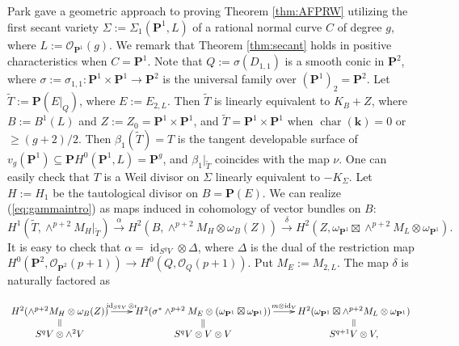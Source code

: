 \documentclass[graybox]{svmult}
\newcommand{\kk}{\mathbf{k}}
\newcommand{\sO}{\mathscr{O}}
\def\nP{\mathbf{P}}
\def\id{\operatorname{id}}
\begin{document}
Park \cite{Park2} gave a geometric approach to proving Theorem \ref{thm:AFPRW} utilizing the first secant variety $\Sigma:=\Sigma_1(\nP^1, L)$ of a rational normal curve $C$ of degree $g$, where $L:=\sO_{\nP^1}(g)$. We remark that Theorem \ref{thm:secant} holds in positive characteristics when $C=\nP^1$. Note that $Q:=\sigma(D_{1,1})$ is a smooth conic in $\nP^2$, where $\sigma:=\sigma_{1,1} \colon \nP^1 \times \nP^1 \to \nP^2$ is the universal family over $(\nP^1)_2=\nP^2$. Let $\widetilde{T}:=\nP(E|_Q)$, where $E:=E_{2, L}$. Then $\widetilde{T}$ is linearly equivalent to $K_{B} + Z$, where $B:=B^1(L)$ and $Z:=Z_0=\nP^1 \times \nP^1$, and $\widetilde{T}=\nP^1 \times \nP^1$ when $\operatorname{char}(\kk) = 0$ or $\geq (g+2)/2$. Then $\beta_1(\widetilde{T})=T$ is the tangent developable surface of $v_g(\nP^1) \subseteq \nP H^0(\nP^1, L)=\nP^g$, and $\beta_1|_{\widetilde{T}}$ coincides with the map $\nu$. One can easily check that $T$ is a Weil divisor on $\Sigma$ linearly equivalent to $-K_{\Sigma}$. Let $H:=H_1$ be the tautological divisor on $B=\nP (E)$. We can realize (\ref{eq:gammaintro}) as maps induced in cohomology of vector bundles on $B$:
$$
H^1(\widetilde{T}, \wedge^{p+2} M_H|_{\widetilde{T}}) \xrightarrow{~\alpha~} H^2(B, \wedge^{p+2} M_H \otimes \omega_B(Z)) \xrightarrow{~\delta~} H^2(Z, \omega_{\nP^1} \boxtimes \wedge^{p+2} M_L \otimes \omega_{\nP^1}).
$$
It is easy to check that $\alpha = \id_{S^qV} \otimes \Delta$, where $\Delta$ is the dual of the restriction map $H^0(\nP^2, \sO_{\nP^2}(p+1)) \rightarrow H^0(Q, \sO_Q(p+1))$. Put $M_E:=M_{2,L}$. The map $\delta$ is naturally factored as\\[-20pt]

\begin{scriptsize}
$$
\xymatrixrowsep{0.1in}
\xymatrixcolsep{0.3in}
\xymatrix{
H^2(\wedge^{p+2} M_H \otimes \omega_B(Z)) \ar@{=}[d] \ar[r]^-{\id_{S^q V} \otimes \iota} & H^2(\sigma^* \wedge^{p+2} M_E \otimes (\omega_{\nP^1} \boxtimes \omega_{\nP^1})) \ar@{=}[d] \ar[r]^-{m \otimes \id_V} & H^2(\omega_{\nP^1} \boxtimes \wedge^{p+2} M_L \otimes \omega_{\nP^1})\ar@{=}[d] \\
S^q V \otimes \wedge^2 V & S^q V \otimes V \otimes V & S^{q+1} V \otimes V,
}
$$
\end{scriptsize}
\end{document}

